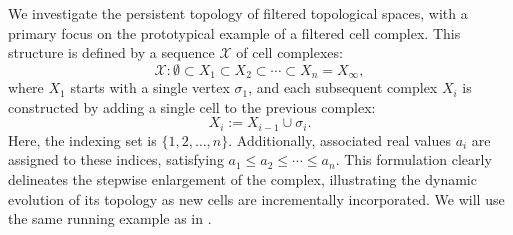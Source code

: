 We investigate the persistent topology of filtered topological spaces, with a primary
focus on the prototypical example of a filtered cell complex. This structure is
defined by a sequence $\mathcal{X}$ of cell complexes:
\begin{equation*}
	\mathcal{X}: \emptyset \subset X_{1} \subset X_{2} \subset \cdots \subset X_{n}
	= X_{\infty},
\end{equation*}
where $X_{1}$ starts with a single vertex $\sigma_{1}$, and each subsequent
complex $X_{i}$ is constructed by adding a single cell to the previous complex:
\begin{equation*}
	X_{i} := X_{i-1}\cup \sigma_{i}.
\end{equation*}
Here, the indexing set is $\{1, 2, \ldots, n\}$. Additionally, associated real
values $a_{i}$ are assigned to these indices, satisfying $a_{1} \leq a_{2} \leq \cdots
\leq a_{n}.$ This formulation clearly delineates the stepwise enlargement of the
complex, illustrating the dynamic evolution of its topology as new cells are
incrementally incorporated. We will use the same running example as in \cite[§2.2]{de2011dualities}.

